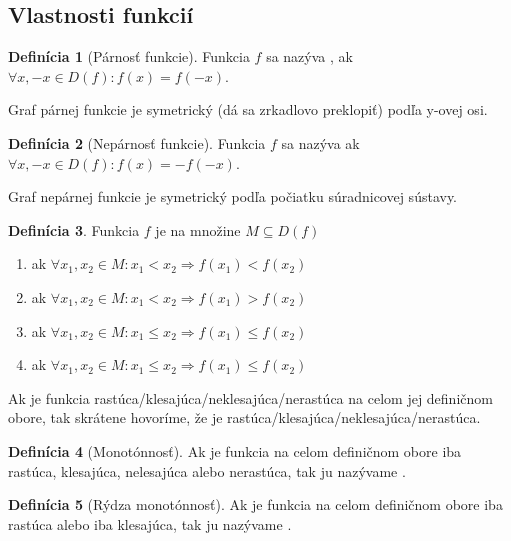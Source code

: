 \documentclass[12pt, twopage]{article}
\theoremstyle{definition}
\newtheorem{definition}{Definícia}
\begin{document}
	\subsection{Vlastnosti funkcií}
	
	\begin{definition}[Párnosť funkcie]
		Funkcia $f$ sa nazýva , ak $\forall x, -x \in D(f): f(x) = f(-x)$.
	\end{definition}
	Graf párnej funkcie je symetrický (dá sa zrkadlovo preklopiť) podľa y-ovej osi.
	
	\begin{definition}[Nepárnosť funkcie]
		Funkcia $f$ sa nazýva  ak $\forall x, -x \in D(f): f(x) = -f(-x)$.
	\end{definition}
	
	Graf nepárnej funkcie je symetrický podľa počiatku súradnicovej sústavy.
	
	\begin{definition}
		Funkcia $f$ je na množine $M \subseteq D(f)$ \\
		\begin{enumerate}
			\item {} ak $\forall x_1, x_2 \in M: x_1 < x_2 \Rightarrow f(x_1) < f(x_2)$
			\item {} ak $\forall x_1, x_2 \in M: x_1 < x_2 \Rightarrow f(x_1) > f(x_2)$
			\item {} ak $\forall x_1, x_2 \in M: x_1 \le x_2 \Rightarrow f(x_1) \le f(x_2)$
			\item {} ak $\forall x_1, x_2 \in M: x_1 \le x_2 \Rightarrow f(x_1) \le f(x_2)$
		\end{enumerate}
 	\end{definition}
 	
 	Ak je funkcia rastúca/klesajúca/neklesajúca/nerastúca na celom jej definičnom obore, tak skrátene hovoríme, že je rastúca/klesajúca/neklesajúca/nerastúca.
 	
 	\begin{definition}[Monotónnosť]
 		Ak je funkcia na celom definičnom obore iba rastúca, klesajúca, nelesajúca alebo nerastúca, tak ju nazývame .
 	\end{definition}
 	
 	\begin{definition}[Rýdza monotónnosť]
 		Ak je funkcia na celom definičnom obore iba rastúca alebo iba klesajúca, tak ju nazývame .
 	\end{definition}
 	
\end{document}
